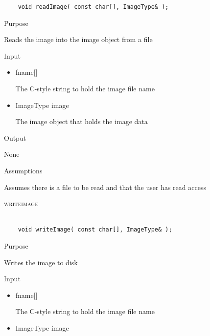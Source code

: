 \documentclass[pdftex, 11pt]{article}
\begin{document}
\begin{description}
\begin{lstlisting}
	void readImage( const char[], ImageType& );
		\end{lstlisting}

		\begin{description}
			\item{Purpose}

				Reads the image into the image object from a file

			\item{Input}

				\begin{itemize}

					\item{fname[]}

						The C-style string to hold the image 
						file name

					\item{ImageType image}

						The image object that holds the
						image data

				\end{itemize}

			\item{Output}

				None

			\item{Assumptions}

				Assumes there is a file to be read and that the
				user has read access

		\end{description}


	\item{\textsc{writeimage}}

		\begin{lstlisting}

	void writeImage( const char[], ImageType& );
		\end{lstlisting}

		\begin{description}
			\item{Purpose}

				Writes the image to disk

			\item{Input}

				\begin{itemize}

					\item{fname[]}

						The C-style string to hold the image 
						file name

					\item{ImageType image}


\end{itemize}
\end{description}
\end{description}
\end{document}
